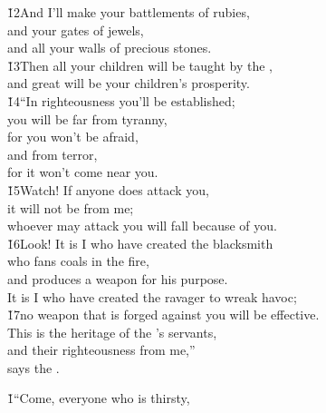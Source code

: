 \begin{poetry}
\poeml \v{12}And I'll make your battlements of rubies, \\
\poemll    and your gates of jewels, \\
\poemlll       and all your walls of precious stones. \\
\poeml \v{13}Then all your children will be taught by the , \\
\poemll    and great will be your children's prosperity. \\
\poeml \v{14}``In righteousness you'll be established; \\
\poemll    you will be far from tyranny, \\
\poemlll       for you won't be afraid, \\
\poemll    and from terror, \\
\poemlll       for it won't come near you. \\
\poeml \v{15}Watch! If anyone does attack you, \\
\poemll    it will not be from me; \\
\poeml whoever may attack you will fall because of you. \\
\poeml \v{16}Look! It is I who have created the blacksmith \\
\poemll    who fans coals in the fire, \\
\poemlll       and produces a weapon for his purpose. \\
\poeml It is I who have created the ravager to wreak havoc; \\
\poeml \v{17}no weapon that is forged against you will be effective. \\
\poeml This is the heritage of the 's servants, \\
\poemll    and their righteousness from me,'' \\
\poemlll       says the .
\end{poetry}

\v{1}``Come, everyone who is thirsty,

